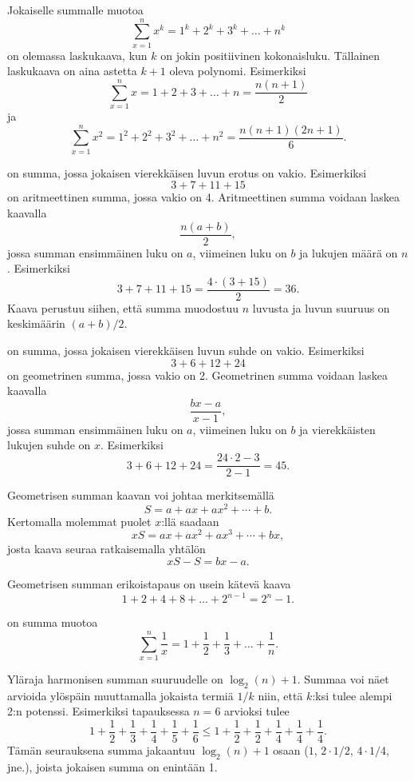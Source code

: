 Jokaiselle summalle muotoa
\[\sum_{x=1}^n x^k = 1^k+2^k+3^k+\ldots+n^k\]
on olemassa laskukaava,
kun $k$ on jokin positiivinen kokonaisluku.
Tällainen laskukaava on aina astetta $k+1$
oleva polynomi. Esimerkiksi
\[\sum_{x=1}^n x = 1+2+3+\ldots+n = \frac{n(n+1)}{2}\]
ja
\[\sum_{x=1}^n x^2 = 1^2+2^2+3^2+\ldots+n^2 = \frac{n(n+1)(2n+1)}{6}.\]

 on summa, 
jossa jokaisen vierekkäisen luvun erotus on vakio.
Esimerkiksi
\[3+7+11+15\]
on aritmeettinen summa,
jossa vakio on 4.
Aritmeettinen summa voidaan laskea kaavalla
\[\frac{n(a+b)}{2},\]
jossa summan ensimmäinen luku on $a$,
viimeinen luku on $b$ ja lukujen määrä on $n$.
Esimerkiksi
\[3+7+11+15=\frac{4 \cdot (3+15)}{2} = 36.\]
Kaava perustuu siihen, että summa muodostuu $n$ luvusta
ja luvun suuruus on keskimäärin $(a+b)/2$.

 on summa,
jossa jokaisen vierekkäisen luvun suhde on vakio.
Esimerkiksi
\[3+6+12+24\]
on geometrinen summa,
jossa vakio on 2.
Geometrinen summa voidaan laskea kaavalla
\[\frac{bx-a}{x-1},\]
jossa summan ensimmäinen luku on $a$,
viimeinen luku on $b$ ja vierekkäisten lukujen suhde on $x$.
Esimerkiksi
\[3+6+12+24=\frac{24 \cdot 2 - 3}{2-1} = 45.\]

Geometrisen summan kaavan voi johtaa merkitsemällä
\[ S = a + ax + ax^2 + \cdots + b .\] 
Kertomalla molemmat puolet $x$:llä saadaan
\[ xS = ax + ax^2 + ax^3 + \cdots + bx,\]
josta kaava seuraa ratkaisemalla yhtälön
\[ xS-S = bx-a.\]

Geometrisen summan erikoistapaus on usein kätevä kaava
\[1+2+4+8+\ldots+2^{n-1}=2^n-1.\]



 on summa muotoa
\[ \sum_{x=1}^n \frac{1}{x} = 1+\frac{1}{2}+\frac{1}{3}+\ldots+\frac{1}{n}.\]

Yläraja harmonisen summan suuruudelle on $\log_2(n)+1$.
Summaa voi näet arvioida ylöspäin
muuttamalla jokaista termiä $1/k$ niin,
että $k$:ksi tulee alempi 2:n potenssi.
Esimerkiksi tapauksessa $n=6$ arvioksi tulee
\[ 1+\frac{1}{2}+\frac{1}{3}+\frac{1}{4}+\frac{1}{5}+\frac{1}{6} \le
1+\frac{1}{2}+\frac{1}{2}+\frac{1}{4}+\frac{1}{4}+\frac{1}{4}.\]
Tämän seurauksena summa jakaantuu $\log_2(n)+1$ osaan
($1$, $2 \cdot 1/2$, $4 \cdot 1/4$, jne.),
joista jokaisen summa on enintään 1.

